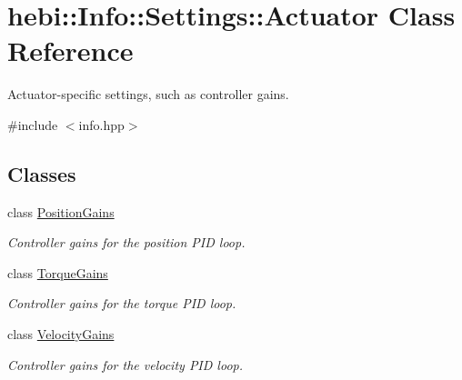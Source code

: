 \hypertarget{classhebi_1_1Info_1_1Settings_1_1Actuator}{}\section{hebi\+:\+:Info\+:\+:Settings\+:\+:Actuator Class Reference}
\label{classhebi_1_1Info_1_1Settings_1_1Actuator}


Actuator-\/specific settings, such as controller gains.  




{\ttfamily \#include $<$info.\+hpp$>$}

\subsection*{Classes}
\begin{DoxyCompactItemize}
\item 
class \hyperlink{classhebi_1_1Info_1_1Settings_1_1Actuator_1_1PositionGains}{Position\+Gains}
\begin{DoxyCompactList}\small\item\em Controller gains for the position P\+ID loop. \end{DoxyCompactList}\item 
class \hyperlink{classhebi_1_1Info_1_1Settings_1_1Actuator_1_1TorqueGains}{Torque\+Gains}
\begin{DoxyCompactList}\small\item\em Controller gains for the torque P\+ID loop. \end{DoxyCompactList}\item 
class \hyperlink{classhebi_1_1Info_1_1Settings_1_1Actuator_1_1VelocityGains}{Velocity\+Gains}
\begin{DoxyCompactList}\small\item\em Controller gains for the velocity P\+ID loop. \end{DoxyCompactList}\end{DoxyCompactItemize}
